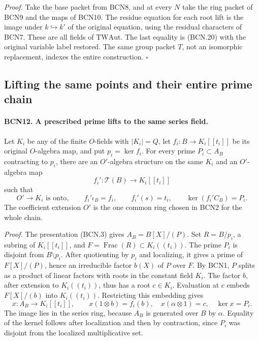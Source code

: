 \emph{Proof.}
Take the base packet from BCN8, and at every \(N\) take the
ring packet of BCN9 and the maps of BCN10.
The residue equation for each root lift is the image under
\(k\hookrightarrow k'\) of the original equation, using
the residual characters of BCN7.  These are all fields
of \(\mathrm{TWAut}\).  The last equality is (BCN.20) with
the original variable label restored.
The same group packet \(T\), not an isomorphic replacement,
indexes the entire construction.
\hfill\(\square\)

\subsection{Lifting the same points and their entire prime chain}

\paragraph{BCN12. A prescribed prime lifts to the same series field.}\label{claim:BCN12}
Let \(K_i\) be any of the finite \(O\)-fields with
\(|K_i|=Q\), let \(f_i:B\to K_i[[t_i]]\) be its original
\(O\)-algebra map, and put \(p_i=\ker f_i\).
For every prime \(P_i\subset A_B\) contracting to \(p_i\),
there are an \(O'\)-algebra structure on the same \(K_i\)
and an \(O'\)-algebra map
\[
 f_i':\mathscr T(B)\longrightarrow K_i[[t_i]]
\]
such that
\[
 O'\longrightarrow K_i\text{ is onto},\qquad
 f_i'\iota_B=f_i,\qquad f_i'(s)=t_i,\qquad
 \ker(f_i' C_B)=P_i.                                           \tag{BCN.29}
\]
The coefficient extension \(O'\) is the one common ring
chosen in BCN2 for the whole chain.

\emph{Proof.}
The presentation (BCN.3) gives
\(A_B=B[X]/(P)\).  Set \(R=B/p_i\), a subring of \(K_i[[t_i]]\),
and \(F=\operatorname{Frac}(R)\subset K_i((t_i))\).
The prime \(P_i\) is disjoint from \(B\setminus p_i\).
After quotienting by \(p_i\) and localizing, it gives a
prime of \(F[X]/(P)\), hence an irreducible factor \(b(X)\)
of \(P\) over \(F\).
By BCN1, \(P\) splits as a product of linear factors with
roots in the constant field \(K_i\).
The factor \(b\), after extension to \(K_i((t_i))\), thus
has a root \(c\in K_i\).
Evaluation at \(c\) embeds \(F[X]/(b)\) into \(K_i((t_i))\).
Restricting this embedding gives
\[
 x:A_B\longrightarrow K_i[[t_i]],\qquad
 x(1\otimes b)=f_i(b),\quad x(\alpha\otimes1)=c,\quad
 \ker x=P_i .                                                 \tag{BCN.30}
\]
The image lies in the series ring, because \(A_B\) is generated
over \(B\) by \(\alpha\).  Equality of the kernel follows
after localization and then by contraction, since \(P_i\)
was disjoint from the localized multiplicative set.

